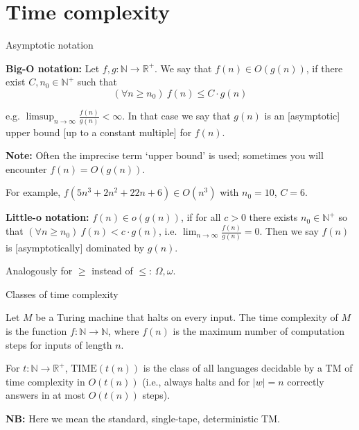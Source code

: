 \documentclass[handout]{beamer}
\begin{document}
\section*{Time complexity}


\begin{frame}{Asymptotic notation}
    
    \textbf{Big-O notation:} Let $f,g: \mathbb{N}\to \mathbb{R}^+$. We say that \alert{$f(n)\in O(g(n))$}, if there exist $C,n_0\in \mathbb{N}^+$ such that
    $$
    (\forall n\geq n_0)\ f(n)\leq C\cdot g(n)
    $$

    e.g. $\limsup_{n\to\infty}\frac{f(n)}{g(n)}<\infty$. In that case we say that $g(n)$ is an [asymptotic] \alert{upper bound} [up to a constant multiple] for $f(n)$. 
    
    \textbf{Note:} Often the imprecise term `upper bound' is used; sometimes you will encounter $f(n)=O(g(n))$.

    For example, $f(5n^3+2n^2+22n+6)\in O(n^3)$ with $n_0=10$, $C=6$.

    \medskip

    \textbf{Little-o notation:} \alert{$f(n)\in o(g(n))$}, if for all $c>0$ there exists $n_0\in \mathbb{N}^+$ so that
    $(\forall n\geq n_0)\ f(n)<c\cdot g(n)$, i.e. $\lim_{n\to\infty}\frac{f(n)}{g(n)}=0$. Then we say $f(n)$ is [asymptotically] \alert{dominated} by $g(n)$.
    
    Analogously for $\geq$ instead of $\leq$:  $\Omega,\omega$.

\end{frame}


\begin{frame}{Classes of time complexity}

    \begin{definition}
        Let $M$ be a Turing machine that halts on every input. The \alert{time complexity} of $M$ is the function $f:\mathbb{N}\to \mathbb{N}$, where $f(n)$ is the maximum number of computation steps for inputs of length $n$.
    \end{definition}
    
    \begin{definition}
        For $t:\mathbb{N}\to \mathbb{R}^+$, \alert{$\mathrm{TIME}(t(n))$} is the class of all languages decidable by a TM of time complexity in $O(t(n))$ (i.e., always halts and for $|w|=n$ correctly answers in at most $O(t(n))$ steps).
    \end{definition}

    \textbf{NB:} Here we mean the standard, single-tape, deterministic TM.
    
\end{frame}
\end{document}
